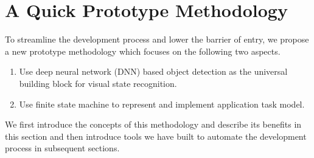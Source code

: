 



\section{A Quick Prototype Methodology}

To streamline the development process and lower the barrier of entry, we propose
a new prototype methodology which focuses on the following two aspects.
\begin{enumerate}
  \item  Use deep neural network (DNN) based object detection as the universal
  building block for visual state recognition.
  \item Use finite state machine to represent and implement application task model.
\end{enumerate}
We first introduce the concepts of this methodology and describe its benefits in
this section and then introduce tools we have built to automate the development
process in subsequent sections.

